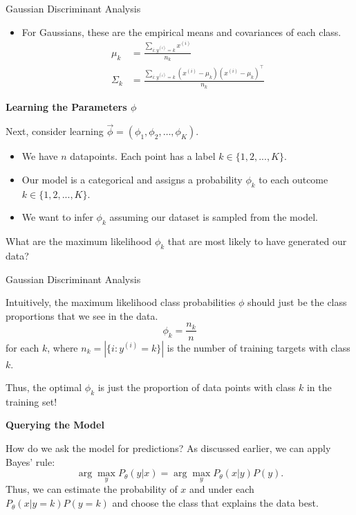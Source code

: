 \documentclass[../../main.tex]{subfiles}
\begin{document}
\begin{frame}[fragile]{Gaussian Discriminant Analysis}

\begin{itemize}
    \item For Gaussians, these are the empirical means and covariances of each class.
    \begin{align*}
    \mu_k & = \frac{\sum_{i: y^{(i)} = k} x^{(i)}}{n_k} \\
    \Sigma_k & = \frac{\sum_{i: y^{(i)} = k} (x^{(i)} - \mu_k)(x^{(i)} - \mu_k)^\top}{n_k} 
    \end{align*}
\end{itemize}

\textbf{Learning the Parameters $\phi$}


Next, consider learning $\vec \phi = (\phi_1, \phi_2, \ldots, \phi_K)$. 
\begin{itemize}
    \item We have $n$ datapoints. Each point has a label $k\in\{1,2,...,K\}$.
    \item Our model is a categorical and assigns a probability $\phi_k$ to each outcome $k\in\{1,2,...,K\}$.
    \item We want to infer $\phi_k$ assuming our dataset is sampled from the model.
\end{itemize}

What are the maximum likelihood $\phi_k$ that are most likely to have generated our data?


\end{frame}

\begin{frame}[fragile]{Gaussian Discriminant Analysis}

Intuitively, the maximum likelihood class probabilities $\phi$ should just be the class proportions that we see in the data. 
$$ \phi_k = \frac{n_k}{n}$$
for each $k$, where $n_k = |\{i : y^{(i)} = k\}|$ is the number of training targets with class $k$.

Thus, the optimal $\phi_k$ is just the proportion of data points with class $k$ in the training set!
\vspace{0.3cm}

\textbf{Querying the Model}

How do we ask the model for predictions? As discussed earlier, we can apply Bayes' rule:
$$\arg\max_y P_\theta(y|x) = \arg\max_y P_\theta(x|y)P(y).$$
Thus, we can estimate the probability of $x$ and under each $P_\theta(x|y=k)P(y=k)$ and choose the class that explains the data best.


\end{frame}
\end{document}
